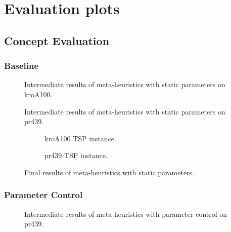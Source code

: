 \chapter{Evaluation plots}
\section{Concept Evaluation}

\subsection{Baseline}\label{app:eval:bl plots}

\begin{figure}[h]
	\centering
	
	\caption{Intermediate results of meta-heuristics with static parameters on kroA100.}
	\label{app:eval:1:bl:kroA100 intermediate}
\end{figure}

\begin{figure}[h]
	\centering
	
	\caption{Intermediate results of meta-heuristics with static parameters on pr439.}
	\label{app:eval:1:bl:pr439 intermediate}
\end{figure}


\begin{figure}[h]
	\centering
	\begin{subfigure}{0.45\textwidth}
		
		\caption{kroA100 TSP instance.}
		\label{app:eval:1:bl:kroA100 final}
	\end{subfigure}
	\begin{subfigure}{0.45\textwidth}
		
		\caption{pr439 TSP instance.}
		\label{app:eval:1:bl:pr439 final}
	\end{subfigure}
	\caption{Final results of meta-heuristics with static parameters.}
	
\end{figure}


\subsection{Parameter Control}\label{app:eval:pc plots}
\begin{figure}[h]
	\centering
	
	\caption{Intermediate results of meta-heuristics with parameter control on pr439.}
	\label{app:eval:1:pc:pr439 intermediate}
\end{figure}

